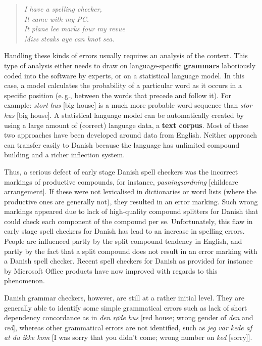 \begin{multicols}{2}
\begin{quote}
  {\it I have a spelling checker,\\
  It came with my PC.\\
  It plane lee marks four my revue\\
  Miss steaks aye can knot sea.}
\end{quote}

Handling these kinds of errors usually requires an analysis of the context. 
This type of analysis either needs to draw on language-specific \textbf{grammars} laboriously coded into the software by experts, or on a statistical language model. In this case, a model calculates the probability of a particular word as it occurs in a specific position (e.\,g., between the words that precede and follow it). For example: \textit{stort hus} [big house] is a much more probable word sequence than \textit{stor hus} [big house]. A statistical language model can be automatically created by using a large amount of (correct) language data, a \textbf{text corpus}. Most of these two approaches have been developed around data from English. Neither approach can transfer easily to Danish because the language has unlimited compound building and a richer inflection system.

Thus, a serious defect of early stage Danish spell checkers was the incorrect markings of productive compounds, for instance, {\it pasningsordning} [childcare arrangement]. If these were not lexicalised in dictionaries or word lists (where the productive ones are generally not), they resulted in an error marking. Such wrong markings appeared due to lack of high-quality compound splitters for Danish that could check each component of the compound per se. Unfortunately, this flaw in early stage spell checkers for Danish has lead to an increase in spelling errors. People are influenced partly by the split compound tendency in English, and partly by the fact that a split compound does not result in an error marking with a Danish spell checker. Recent spell checkers for Danish as provided for instance by Microsoft Office products have now improved with regards to this phenomenon. 

Danish grammar checkers, however, are still at a rather initial level. They are generally able to identify some simple grammatical errors such as lack of short dependency concordance as in {\it *den r\o de hus} [red house; wrong gender of {\it den} and {\it red}], whereas other grammatical errors are not identified, such as {\it *jeg var kede af at du ikke kom} [I was sorry that you didn't come; wrong number on {\it ked} [sorry]]. 


\end{multicols}
